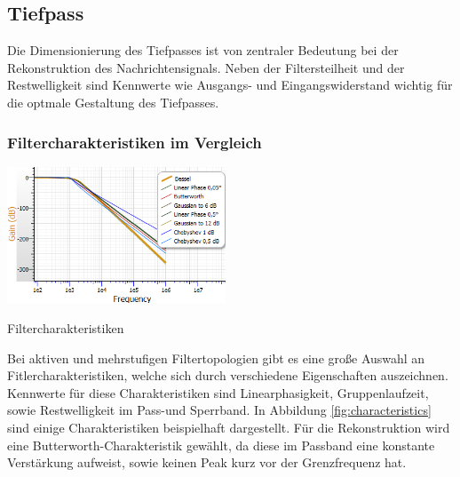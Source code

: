\newpage
\subsection{Tiefpass}
Die Dimensionierung des Tiefpasses ist von zentraler Bedeutung bei der Rekonstruktion des Nachrichtensignals. Neben der Filtersteilheit und der Restwelligkeit sind Kennwerte wie Ausgangs- und Eingangswiderstand wichtig für die optmale Gestaltung des Tiefpasses.
\subsubsection{Filtercharakteristiken im Vergleich} 
\begin{floatingfigure}[r]{7cm}
	\includegraphics[width=6.5cm]{gfx/simRx/characteristics.png}
	\caption{Filtercharakteristiken}
\label{fig:characteristics}
\end{floatingfigure}
\noindent
Bei aktiven und mehrstufigen Filtertopologien gibt es eine große Auswahl an Fitlercharakteristiken, welche sich durch verschiedene Eigenschaften auszeichnen. Kennwerte für diese Charakteristiken sind Linearphasigkeit, Gruppenlaufzeit, sowie Restwelligkeit im Pass-und Sperrband. In Abbildung \ref{fig:characteristics} sind einige Charakteristiken beispielhaft dargestellt. Für die Rekonstruktion wird eine Butterworth-Charakteristik gewählt, da diese im Passband eine konstante Verstärkung aufweist, sowie keinen Peak kurz vor der Grenzfrequenz hat.\\

